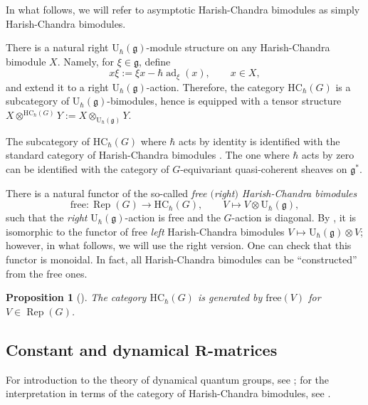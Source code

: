 \documentclass[10pt,a4paper]{amsart}
\numberwithin{equation}{section}
\newtheorem{Proposition}[Theorem]{Proposition}
{ \theoremstyle{definition}
	\newtheorem{Definition}[Theorem]{Definition}
	\newtheorem{Note}[Theorem]{Note}
	\newtheorem{Example}[Theorem]{Example}
	\newtheorem{Remark}[Theorem]{Remark} }
\newcommand{\U}{\mathrm{U}_{\hbar}}
\newcommand{\g}{\mathfrak{g}}
\DeclareMathOperator{\ad}{ad}
\newcommand{\free}{\mathrm{free}}
\newcommand{\HC}{\mathrm{HC}_{\hbar}}
\DeclareMathOperator{\Rep}{Rep}
\begin{document}
	In what follows, we will refer to asymptotic Harish-Chandra bimodules as simply Harish-Chandra bimodules.
	
	There is a natural right $\U(\g)$-module structure on any Harish-Chandra bimodule $X$. Namely, for $\xi \in\g$, define
	\begin{equation}
		\label{eq::left_action}
		x\xi := \xi x - \hbar \ad_{\xi}(x),\qquad x\in X,
	\end{equation}
	and extend it to a right $\U(\g)$-action. Therefore, the category $\HC(G)$ is a subcategory of $\U(\g)$-bimodules, hence is equipped with a tensor structure
$
	X \otimes^{\HC(G)} Y := X \otimes_{\U(\g)} Y$.
	
	\begin{Remark}
		The subcategory of $\HC(G)$ where $\hbar$ acts by identity is identified with the standard category of Harish-Chandra bimodules \cite[Definition 5.2]{BernsteinGelfand}. The one where $\hbar$ acts by zero can be identified with the category of $G$-equivariant quasi-coherent sheaves on $\g^*$.
	\end{Remark}
	
	There is a natural functor of the so-called \emph{free $($right$)$ Harish-Chandra bimodules}
	\[
	\free \colon \Rep(G) \rightarrow \HC(G), \qquad V \mapsto V \otimes \U(\g),
	\]
	such that the \emph{right} $\U(\g)$-action is free and the $G$-action is diagonal. By \cite[equation~(28)]{KalmykovSafronov}, it is isomorphic to the functor of free \emph{left} Harish-Chandra bimodules $V \mapsto \U(\g) \otimes V$; however, in what follows, we will use the right version. One can check that this functor is monoidal. In fact, all Harish-Chandra bimodules can be ``constructed'' from the free ones.
	\begin{Proposition}[{\cite[Proposition 2.7]{KalmykovSafronov}}]
		\label{prop::hc_generators}
		The category $\HC(G)$ is generated by $\free(V)$ for $V \in \Rep(G)$.
	\end{Proposition}
	
	\subsection[Constant and dynamical R-matrices]{Constant and dynamical $\boldsymbol{R}$-matrices}
	\label{subsect::dynamica_r_mat}
	For introduction to the theory of dynamical quantum groups, see \cite{EtingofSchiffmann}; for the interpretation in terms of the category of Harish-Chandra bimodules, see \cite{KalmykovSafronov}.
	
\end{document}
